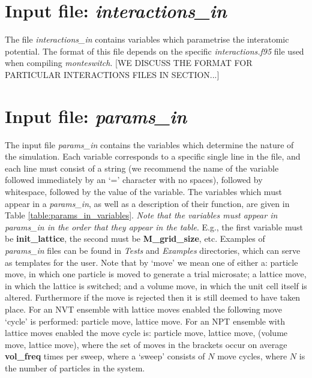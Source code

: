 \documentclass{report}
\begin{document}
\section{Input file: \emph{interactions\_in}}
The file \emph{interactions\_in} contains variables which parametrise the interatomic potential. The format of this file depends on
the specific \emph{interactions.f95} file used when compiling \emph{monteswitch}. [WE DISCUSS THE FORMAT FOR PARTICULAR INTERACTIONS
FILES IN SECTION...]

\section{Input file: \emph{params\_in}}
The input file \emph{params\_in} contains the variables which determine the nature of the simulation. Each variable corresponds to a
specific single line in the file, and each line must consist of a string (we recommend the name of the variable followed immediately
by an `=' character with no spaces), followed by whitespace, followed by the value of the variable. The variables which must appear
in a \emph{params\_in}, as well as a description of their function, are given in Table \ref{table:params_in_variables}. 
\emph{Note that the variables must appear in params\_in in the order that they appear in the table}. E.g., the first 
variable must be \textbf{init\_lattice}, the second must be \textbf{M\_grid\_size}, etc. Examples of \emph{params\_in} files can
be found in \emph{Tests} and \emph{Examples} directories, which can serve as templates for the user.
%
Note that by `move' we mean one of either a: particle move, in which one particle is moved to generate a trial microsate; a lattice move, in 
which the lattice is switched; and a volume move, in which the unit cell itself is altered. Furthermore if the move is rejected then it is 
still deemed to have taken place. For an NVT ensemble with lattice moves enabled the following move `cycle' is performed: particle move, 
lattice move. For an NPT ensemble with lattice moves enabled the move cycle is: particle move, lattice move, (volume move, lattice move), 
where the set of moves in the brackets occur on average \textbf{vol\_freq} times per sweep, where a `sweep' consists of $N$ move cycles,
where $N$ is the number of particles in the system.
\end{document}

